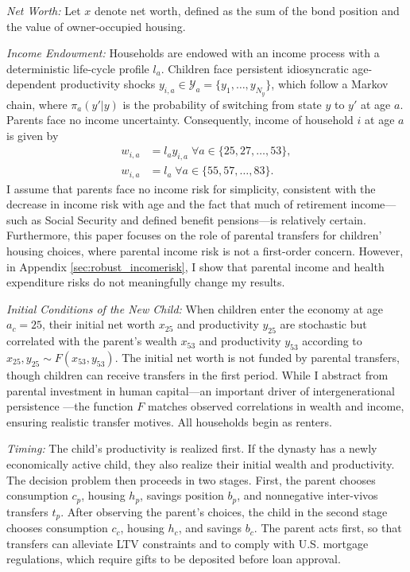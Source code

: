 \documentclass[12pt]{article}
\begin{document}
\textit{Net Worth:} Let $x$ denote net worth, defined as the sum of the bond position and the value of owner-occupied housing.

\textit{Income Endowment:} Households are endowed with an income process with a deterministic life-cycle profile $l_a$. Children face persistent idiosyncratic age-dependent productivity shocks $y_{i,a}\in\mathcal{Y}_a=\{y_1,\dots,y_{N_y}\}$, which follow a Markov chain, where $\pi_a(y'|y)$ is the probability of switching from state $y$ to $y'$ at age $a$. Parents face no income uncertainty. Consequently, income of household $i$ at age $a$ is given by
\begin{align}
w_{i,a} &= l_ay_{i,a} \; \forall a\in\{25,27,\dots,53\}, \label{eq:wk} \\
w_{i,a} &= l_a \; \forall a\in\{55,57,\dots,83\}. \label{eq:wp}
\end{align}
I assume that parents face no income risk for simplicity, consistent with the decrease in income risk with age \citep{Sanchez2020} and the fact that much of retirement income---such as Social Security and defined benefit pensions---is relatively certain. Furthermore, this paper focuses on the role of parental transfers for children' housing choices, where parental income risk is not a first-order concern. However, in Appendix \ref{sec:robust_incomerisk}, I show that parental income and health expenditure risks do not meaningfully change my results.

\textit{Initial Conditions of the New Child:} When children enter the economy at age $a_c=25$, their initial net worth $x_{25}$ and productivity $y_{25}$ are stochastic but correlated with the parent's wealth $x_{53}$ and productivity $y_{53}$ according to $x_{25}, y_{25} \sim F(x_{53}, y_{53})$. The initial net worth is not funded by parental transfers, though children can receive transfers in the first period. While I abstract from parental investment in human capital—an important driver of intergenerational persistence \citep[see e.g.,][]{Daruich2018,Lee2019}—the function $F$ matches observed correlations in wealth and income, ensuring realistic transfer motives. All households begin as renters.

\textit{Timing:} The child's productivity is realized first. If the dynasty has a newly economically active child, they also realize their initial wealth and productivity. The decision problem then proceeds in two stages. First, the parent chooses consumption $c_p$, housing $h_p$, savings position $b_p$, and nonnegative inter-vivos transfers $t_p$. After observing the parent's choices, the child in the second stage chooses consumption $c_c$, housing $h_c$, and savings $b_c$. The parent acts first, so that transfers can alleviate LTV constraints and to comply with U.S. mortgage regulations, which require gifts to be deposited before loan approval.
\end{document}

